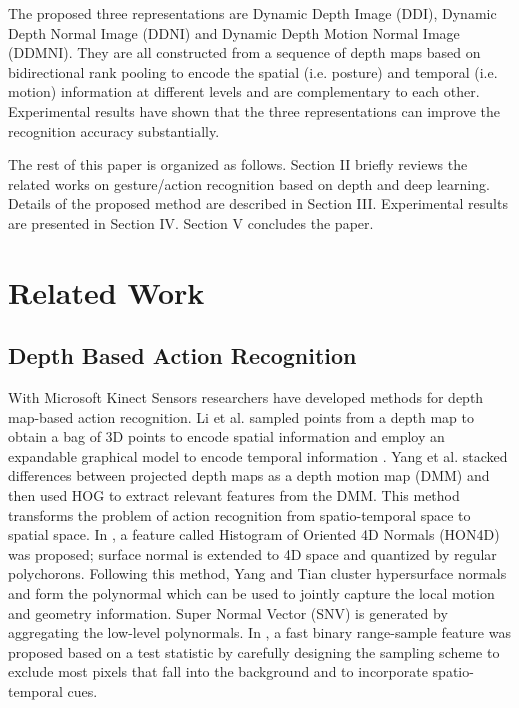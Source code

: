 \documentclass[10pt, a4paper, conference]{IEEEtran}
\begin{document}

The proposed three representations are Dynamic Depth Image (DDI), Dynamic Depth Normal Image (DDNI) and Dynamic Depth Motion Normal Image (DDMNI). They are all constructed from a sequence of depth maps based on bidirectional rank pooling to encode the spatial (i.e. posture) and temporal (i.e. motion) information at different levels and are complementary to each other. Experimental results have shown that the three representations can improve the recognition accuracy substantially.

The rest of this paper is organized as follows. Section II briefly reviews the related works on gesture/action recognition based on depth and deep learning. Details of the proposed method are described in Section III. Experimental results are presented in Section IV. Section V concludes the paper.

\section{Related Work}
\subsection{Depth Based Action Recognition}
With Microsoft Kinect Sensors researchers have developed methods for depth map-based action recognition. Li et al. \cite{li2010action} sampled points
from a depth map to obtain a bag of 3D points to encode spatial information and
employ an expandable graphical model to encode temporal information
\cite{li2008}. Yang et al. \cite{Yang2012a} stacked differences between projected depth maps as
a depth motion map (DMM) and then used HOG to extract relevant features from the
DMM. This method transforms the problem of action recognition from
spatio-temporal space to spatial space.  In \cite{Oreifej2013}, a feature called Histogram of Oriented 4D
Normals (HON4D) was proposed; surface normal is extended to 4D space and
quantized by regular polychorons. Following this method, Yang and Tian
\cite{yangsuper} cluster hypersurface normals and form the polynormal which can
be used to jointly capture the local motion and geometry information. Super
Normal Vector (SNV) is generated by aggregating the low-level polynormals. In
\cite{lurange}, a fast binary range-sample feature was proposed based on a test
statistic by carefully designing the sampling scheme to exclude most pixels that
fall into the background and to incorporate spatio-temporal cues.
\end{document}
